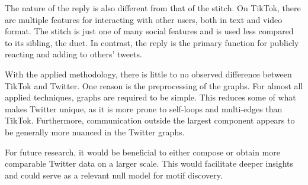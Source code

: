 The nature of the reply is also different from that of the stitch. On TikTok, there are multiple features for interacting with other users, both in text and video format. The stitch is just one of many social features and is used less compared to its sibling, the duet. In contrast, the reply is the primary function for publicly reacting and adding to others' tweets.

With the applied methodology, there is little to no observed difference between TikTok and Twitter. One reason is the preprocessing of the graphs. For almost all applied techniques, graphs are required to be simple. This reduces some of what makes Twitter unique, as it is more prone to self-loops and multi-edges than TikTok. Furthermore, communication outside the largest component appears to be generally more nuanced in the Twitter graphs.

For future research, it would be beneficial to either compose or obtain more comparable Twitter data on a larger scale. This would facilitate deeper insights and could serve as a relevant null model for motif discovery.












